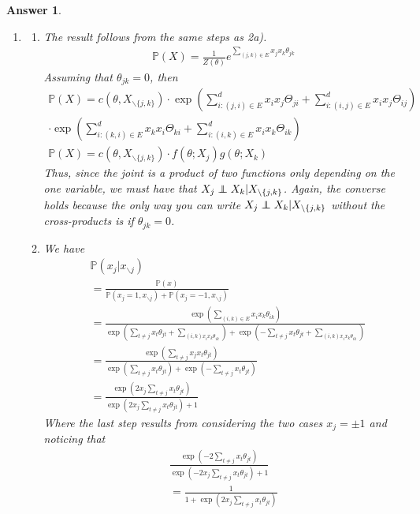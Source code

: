 \documentclass[12pt]{article}
\newcommand\independent{\protect\mathpalette{\protect\independenT}{\perp}}
\def\independenT#1#2{\mathrel{\rlap{$#1#2$}\mkern2mu{#1#2}}}
\theoremstyle{colon}
\newtheorem*{answer}{Answer}
\begin{document}
\begin{answer}
\begin{enumerate}[label=\arabic*)]
    \item \leavevmode
      \begin{enumerate}[label=\alph*)]
        \item The result follows from the same steps as 2a).
          \begin{gather*}
            \mathbb{P}(X) = \frac{1}{Z(\theta)} e^{\sum_{(j,k) \in E} x_j x_k \theta_{jk}}
          \end{gather*}
          Assuming that $\theta_{jk} = 0$, then
          \begin{gather*}
            \mathbb{P}(X) = c(\theta, X_{\backslash \{j,k\}}) \cdot \exp(\sum_{i : (j,i) \in E}^d x_i x_j \Theta_{ji} + \sum_{i : (i,j) \in E}^d x_i x_j \Theta_{ij}) \\
            \cdot \exp(\sum_{i : (k,i) \in E}^d x_k x_i \Theta_{ki} + \sum_{i : (i,k) \in E}^d x_i x_k \Theta_{ik}) \\
            \mathbb{P}(X) = c(\theta, X_{\backslash \{j,k\}}) \cdot f(\theta; X_j) g(\theta; X_k)
          \end{gather*}
          Thus, since the joint is a product of two functions only depending on the one variable, we must have that $X_j \independent X_k | X_{\backslash \{j,k\}}$. Again, the converse holds because the only way you can write $X_j \independent X_k | X_{\backslash \{j,k\}}$ without the cross-products is if $\theta_{jk} = 0$.

        \item We have
          \begin{align*}
            &\mathbb{P}(x_j | x_{\backslash j}) \\
            &= \frac{\mathbb{P}(x)}{\mathbb{P}(x_j = 1, x_{\backslash j}) + \mathbb{P}(x_j = -1, x_{\backslash j})} \\
            &= \frac{\exp(\sum_{(i,k) \in E} x_i x_k \theta_{ik})}{\exp(\sum_{t \neq j} x_t \theta_{jt} + \sum_{(i,k) x_i x_k \theta_{ik}}) + \exp(-\sum_{t \neq j} x_t \theta_{jt} + \sum_{(i,k) x_i x_k \theta_{ik}})} \\
            &= \frac{\exp(\sum_{t \neq j} x_j x_t \theta_{jt})}{\exp(\sum_{t \neq j} x_t \theta_{jt}) + \exp(-\sum_{t \neq j} x_t \theta_{jt})} \\
            &= \frac{\exp(2 x_j \sum_{t \neq j} x_t \theta_{jt})}{\exp(2 x_j \sum_{t \neq j} x_t \theta_{jt}) + 1}
          \end{align*}
          Where the last step results from considering the two cases $x_j = \pm 1$ and noticing that
          \begin{gather*}
            \frac{\exp(-2 \sum_{t \neq j} x_t \theta_{jt})}{\exp(-2 x_j \sum_{t \neq j} x_t \theta_{jt}) + 1} \\
            = \frac{1}{1 + \exp(2 x_j \sum_{t \neq j} x_t \theta_{jt})}
          \end{gather*}
      \end{enumerate}
  \end{enumerate}
\end{answer}
\end{document}
